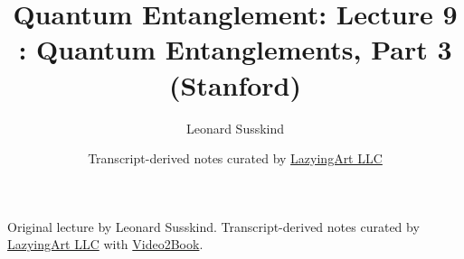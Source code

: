 \documentclass[11pt,oneside]{book}
\begin{document}
\frontmatter
\title{Quantum Entanglement: Lecture 9 : Quantum Entanglements, Part 3 (Stanford)}
\author{Leonard Susskind}
\date{Transcript-derived notes curated by \href{https://lazying.art}{LazyingArt LLC}}
\maketitle
\begin{center}
\small Original lecture by Leonard Susskind. Transcript-derived notes curated by \href{https://lazying.art}{LazyingArt LLC} with \href{https://github.com/lachlanchen/Video2Book}{Video2Book}.
\end{center}
\clearpage
\mainmatter

\end{document}
